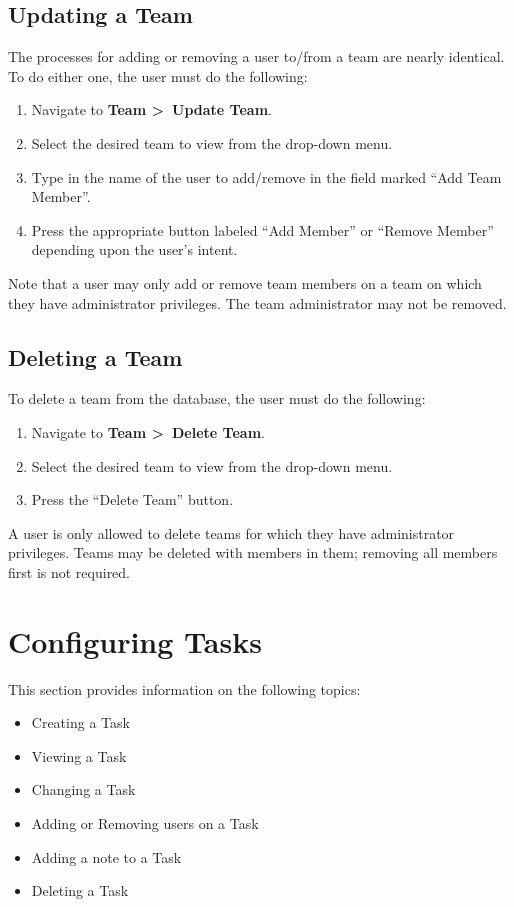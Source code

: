 \documentclass[12pt]{article}
\begin{document}
\subsection{Updating a Team}
The processes for adding or removing a user to/from a team are nearly identical.  To do either one, the user must do the following:
\begin{enumerate}
  \item Navigate to \textbf{Team \textgreater~Update Team}.
  \item Select the desired team to view from the drop-down menu.
  \item Type in the name of the user to add/remove in the field marked ``Add Team Member''.
  \item Press the appropriate button labeled ``Add Member'' or ``Remove Member'' depending upon the user's intent.
\end{enumerate}
Note that a user may only add or remove team members on a team on which they have administrator privileges.  The team administrator may not be removed.
\subsection{Deleting a Team}
To delete a team from the database, the user must do the following:
\begin{enumerate}
  \item Navigate to \textbf{Team \textgreater~Delete Team}.
  \item Select the desired team to view from the drop-down menu.
  \item Press the ``Delete Team'' button.
\end{enumerate}
A user is only allowed to delete teams for which they have administrator privileges.  Teams may be deleted with members in them; removing all members first is not required.

\newpage
\section{Configuring Tasks}
This section provides information on the following topics:
\begin{itemize}
  \item Creating a Task
  \item Viewing a Task
  \item Changing a Task
  \item Adding or Removing users on a Task
  \item Adding a note to a Task
  \item Deleting a Task
\end{itemize}
\end{document}

